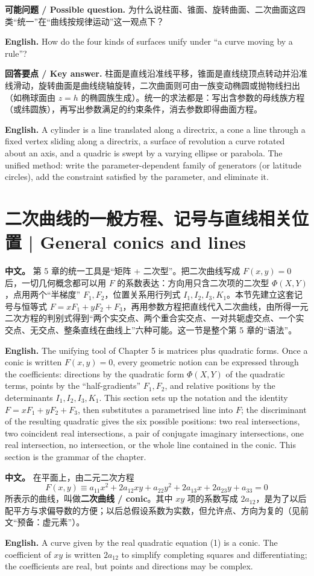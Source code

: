 \documentclass[UTF8,11pt,a4paper]{ctexart}
\newcommand{\APS}[2]{\par\noindent\textbf{中文。} #1\par\noindent\textbf{English.} #2\par\smallskip}
\newcommand{\EN}[1]{\par\noindent \textbf{English.} #1\par}
\newcommand{\ASK}[4]{\par\noindent \textbf{可能问题 / Possible question.} #1\par\EN{#2}\noindent \textbf{回答要点 / Key answer.} #3\par\EN{#4}\medskip}
\theoremstyle{definition}
\begin{document}
\ASK{为什么说柱面、锥面、旋转曲面、二次曲面这四类``统一''在``曲线按规律运动''这一观点下？}{How do the four kinds of surfaces unify under ``a curve moving by a rule''?}{柱面是直线沿准线平移，锥面是直线绕顶点转动并沿准线滑动，旋转曲面是曲线绕轴旋转，二次曲面则可由一族变动椭圆或抛物线扫出（如椭球面由 $z=h$ 的椭圆族生成）。统一的求法都是：写出含参数的母线族方程（或纬圆族），再写出参数满足的约束条件，消去参数即得曲面方程。}{A cylinder is a line translated along a directrix, a cone a line through a fixed vertex sliding along a directrix, a surface of revolution a curve rotated about an axis, and a quadric is swept by a varying ellipse or parabola. The unified method: write the parameter-dependent family of generators (or latitude circles), add the constraint satisfied by the parameter, and eliminate it.}

\section{\label{sec:9}二次曲线的一般方程、记号与直线相关位置 | General conics and lines}
\APS{第 5 章的统一工具是``矩阵 + 二次型''。把二次曲线写成 $F(x,y)=0$ 后，一切几何概念都可以用 $F$ 的系数表达：方向用只含二次项的二次型 $\Phi(X,Y)$，点用两个``半梯度'' $F_1,F_2$，位置关系用行列式 $I_1,I_2,I_3,K_1$。本节先建立这套记号与恒等式 $F=xF_1+yF_2+F_3$，再用参数方程把直线代入二次曲线，由所得一元二次方程的判别式得到``两个实交点、两个重合实交点、一对共轭虚交点、一个实交点、无交点、整条直线在曲线上''六种可能。这一节是整个第 5 章的``语法''。}{The unifying tool of Chapter 5 is matrices plus quadratic forms. Once a conic is written $F(x,y)=0$, every geometric notion can be expressed through the coefficients: directions by the quadratic form $\Phi(X,Y)$ of the quadratic terms, points by the ``half-gradients'' $F_1,F_2$, and relative positions by the determinants $I_1,I_2,I_3,K_1$. This section sets up the notation and the identity $F=xF_1+yF_2+F_3$, then substitutes a parametrised line into $F$; the discriminant of the resulting quadratic gives the six possible positions: two real intersections, two coincident real intersections, a pair of conjugate imaginary intersections, one real intersection, no intersection, or the whole line contained in the conic. This section is the grammar of the chapter.}

\APS{在平面上，由二元二次方程
\[
F(x,y)\equiv a_{11}x^2+2a_{12}xy+a_{22}y^2+2a_{13}x+2a_{23}y+a_{33}=0\tag{1}
\]
所表示的曲线，叫做\textbf{二次曲线 / conic}。其中 $xy$ 项的系数写成 $2a_{12}$，是为了以后配平方与求偏导数的方便；以后总假设系数为实数，但允许点、方向为复的（见前文``预备：虚元素''）。}{A curve given by the real quadratic equation (1) is a conic. The coefficient of $xy$ is written $2a_{12}$ to simplify completing squares and differentiating; the coefficients are real, but points and directions may be complex.}
\end{document}
